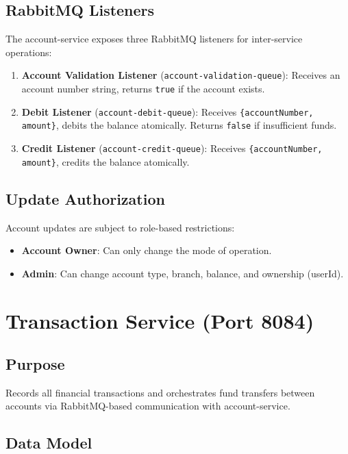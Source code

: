 \documentclass[12pt,a4paper]{report}
\begin{document}
\subsection{RabbitMQ Listeners}
The account-service exposes three RabbitMQ listeners for inter-service operations:

\begin{enumerate}
    \item \textbf{Account Validation Listener} (\texttt{account-validation-queue}): Receives an account number string, returns \texttt{true} if the account exists.
    \item \textbf{Debit Listener} (\texttt{account-debit-queue}): Receives \texttt{\{accountNumber, amount\}}, debits the balance atomically. Returns \texttt{false} if insufficient funds.
    \item \textbf{Credit Listener} (\texttt{account-credit-queue}): Receives \texttt{\{accountNumber, amount\}}, credits the balance atomically.
\end{enumerate}

\subsection{Update Authorization}
Account updates are subject to role-based restrictions:
\begin{itemize}
    \item \textbf{Account Owner}: Can only change the mode of operation.
    \item \textbf{Admin}: Can change account type, branch, balance, and ownership (userId).
\end{itemize}

\section{Transaction Service (Port 8084)}

\subsection{Purpose}
Records all financial transactions and orchestrates fund transfers between accounts via RabbitMQ-based communication with account-service.

\subsection{Data Model}
\end{document}
